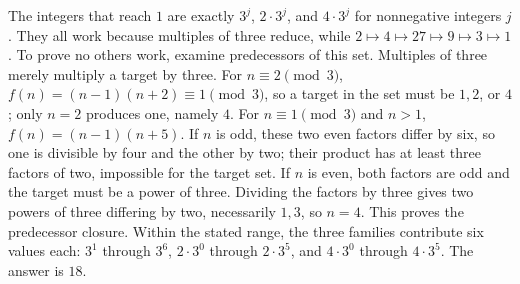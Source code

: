 The integers that reach $1$ are exactly $3^j$, $2\cdot3^j$, and $4\cdot3^j$ for nonnegative integers $j$. They all work because multiples of three reduce, while $2\mapsto4\mapsto27\mapsto9\mapsto3\mapsto1$. To prove no others work, examine predecessors of this set. Multiples of three merely multiply a target by three. For $n\equiv2\pmod3$, $f(n)=(n-1)(n+2)\equiv1\pmod3$, so a target in the set must be $1,2$, or $4$; only $n=2$ produces one, namely $4$. For $n\equiv1\pmod3$ and $n>1$, $f(n)=(n-1)(n+5)$. If $n$ is odd, these two even factors differ by six, so one is divisible by four and the other by two; their product has at least three factors of two, impossible for the target set. If $n$ is even, both factors are odd and the target must be a power of three. Dividing the factors by three gives two powers of three differing by two, necessarily $1,3$, so $n=4$. This proves the predecessor closure. Within the stated range, the three families contribute six values each: $3^1$ through $3^6$, $2\cdot3^0$ through $2\cdot3^5$, and $4\cdot3^0$ through $4\cdot3^5$. The answer is $\boxed{18}$.
